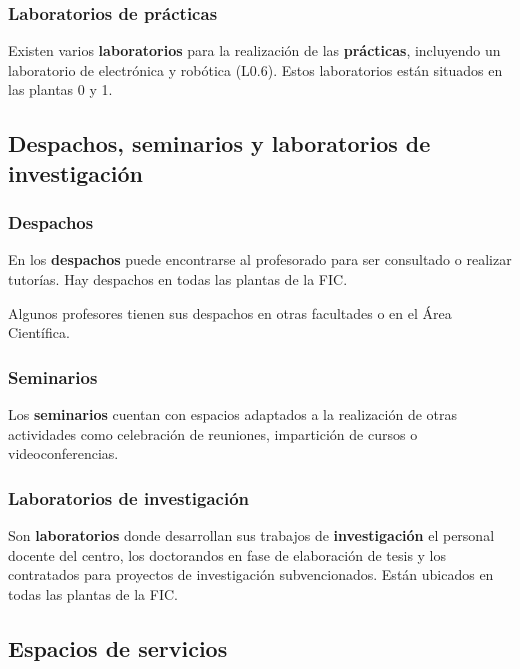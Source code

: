 \subsubsection{Laboratorios de prácticas}

Existen varios \textbf{laboratorios} para la realización de las \textbf{prácticas}, incluyendo un laboratorio de electrónica y robótica (L0.6). Estos laboratorios están situados en las plantas 0 y 1.

\subsection{Despachos, seminarios y laboratorios de investigación}

\subsubsection{Despachos}

En los \textbf{despachos} puede encontrarse al profesorado para ser consultado o realizar tutorías. Hay despachos en  todas las plantas de la \acrshort{FIC}.

\begin{infoBox}
    Algunos profesores tienen sus despachos en otras facultades o en el Área Científica.
\end{infoBox}

\subsubsection{Seminarios}

Los \textbf{seminarios} cuentan con espacios adaptados a la realización de otras actividades como celebración de reuniones, impartición de cursos o videoconferencias.

\subsubsection{Laboratorios de investigación}

Son \textbf{laboratorios} donde desarrollan sus trabajos de \textbf{investigación} el personal docente del centro, los doctorandos en fase de elaboración de tesis y los contratados para proyectos de investigación subvencionados. Están ubicados en todas las plantas de la \acrshort{FIC}.

\subsection{Espacios de servicios}

